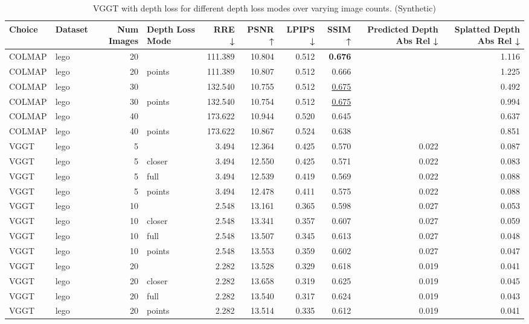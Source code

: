 \begin{table}[H]
\caption{VGGT with depth loss for different depth loss modes over varying image counts. (Synthetic)}
\label{tab:05_depth_loss_num_images_synthetic}
\centering
\scriptsize
\begin{tabular}{llrlrrrrrr}
\toprule
Choice & Dataset & Num Images & Depth Loss Mode & RRE ↓ & PSNR ↑ & LPIPS ↓ & SSIM ↑ & Predicted Depth Abs Rel ↓ & Splatted Depth Abs Rel ↓ \\
\midrule
COLMAP & lego & 20 &  & 111.389 & 10.804 & 0.512 & \textbf{0.676} &  & 1.116 \\
COLMAP & lego & 20 & points & 111.389 & 10.807 & 0.512 & 0.666 &  & 1.225 \\
COLMAP & lego & 30 &  & 132.540 & 10.755 & 0.512 & \underline{0.675} &  & 0.492 \\
COLMAP & lego & 30 & points & 132.540 & 10.754 & 0.512 & \underline{0.675} &  & 0.994 \\
COLMAP & lego & 40 &  & 173.622 & 10.944 & 0.520 & 0.645 &  & 0.637 \\
COLMAP & lego & 40 & points & 173.622 & 10.867 & 0.524 & 0.638 &  & 0.851 \\
VGGT & lego & 5 &  & 3.494 & 12.364 & 0.425 & 0.570 & 0.022 & 0.087 \\
VGGT & lego & 5 & closer & 3.494 & 12.550 & 0.425 & 0.571 & 0.022 & 0.083 \\
VGGT & lego & 5 & full & 3.494 & 12.539 & 0.419 & 0.569 & 0.022 & 0.088 \\
VGGT & lego & 5 & points & 3.494 & 12.478 & 0.411 & 0.575 & 0.022 & 0.088 \\
VGGT & lego & 10 &  & 2.548 & 13.161 & 0.365 & 0.598 & 0.027 & 0.053 \\
VGGT & lego & 10 & closer & 2.548 & 13.341 & 0.357 & 0.607 & 0.027 & 0.059 \\
VGGT & lego & 10 & full & 2.548 & 13.507 & 0.345 & 0.613 & 0.027 & 0.048 \\
VGGT & lego & 10 & points & 2.548 & 13.553 & 0.359 & 0.602 & 0.027 & 0.047 \\
VGGT & lego & 20 &  & 2.282 & 13.528 & 0.329 & 0.618 & 0.019 & 0.041 \\
VGGT & lego & 20 & closer & 2.282 & 13.658 & 0.319 & 0.625 & 0.019 & 0.045 \\
VGGT & lego & 20 & full & 2.282 & 13.540 & 0.317 & 0.624 & 0.019 & 0.043 \\
VGGT & lego & 20 & points & 2.282 & 13.514 & 0.335 & 0.612 & 0.019 & 0.041 \\

\end{tabular}
\end{table}
